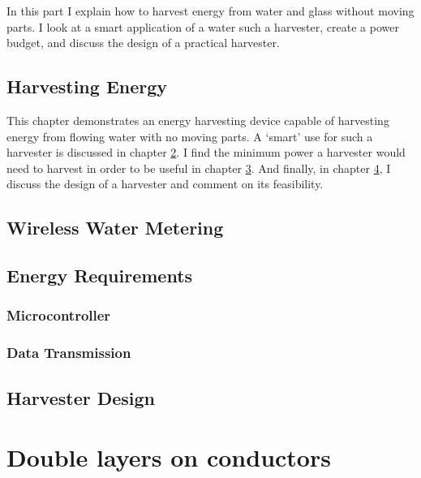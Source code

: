         In this part I explain how to harvest energy from water and glass without moving parts.
        I look at a smart application of a water such a harvester, create a power budget, and discuss the design of a practical harvester.
        
    \chapter{Harvesting Energy}

        This chapter demonstrates an energy harvesting device capable of harvesting energy from flowing water with no moving parts.
        A `smart' use for such a harvester is discussed in chapter \ref{chap:wirelessWaterMetering}.
        I find the minimum power a harvester would need to harvest in order to be useful in chapter \ref{chap:energyRequirements}.
        And finally, in chapter \ref{chap:harvesterDesign}, I discuss the design of a harvester and comment on its feasibility.
    \label{chap:harvestingEnergy}
        

    \chapter{Wireless Water Metering}
    \label{chap:wirelessWaterMetering}
        
    \chapter{Energy Requirements}
    \label{chap:energyRequirements}
        \section{Microcontroller}
            
        \section{Data Transmission}
            
    \chapter{Harvester Design}
    \label{chap:harvesterDesign}
        

\part{\label{part:doubleLayersOnConductors}Double layers on conductors}
